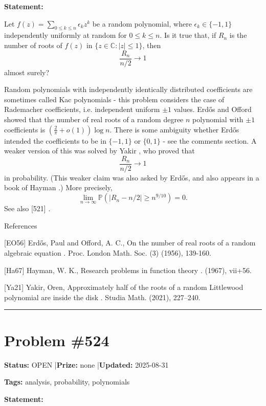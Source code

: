 \documentclass{article}
\begin{document}
\noindent\textbf{Statement:}

Let $f(z)=\sum_{0\leq k\leq n} \epsilon_k z^k$ be a random polynomial, where $\epsilon_k\in \{-1,1\}$ independently uniformly at random for $0\leq k\leq n$. Is it true that, if $R_n$ is the number of roots of $f(z)$ in $\{ z\in \mathbb{C} : \lvert z\rvert \leq 1\}$, then\[\frac{R_n}{n/2}\to 1\]almost surely?




Random polynomials with independently identically distributed coefficients are sometimes called Kac polynomials - this problem considers the case of Rademacher coefficients, i.e. independent uniform $\pm 1$ values. Erd\H{o}s and Offord \cite{EO56} showed that the number of real roots of a random degree $n$ polynomial with $\pm 1$ coefficients is $(\frac{2}{\pi}+o(1))\log n$. There is some ambiguity whether Erd\H{o}s intended the coefficients to be in $\{-1,1\}$ or $\{0,1\}$ - see the comments section. A weaker version of this was solved by Yakir \cite{Ya21}, who proved that\[\frac{R_n}{n/2}\to 1\]in probability. (This weaker claim was also asked by Erd\H{o}s, and also appears in a book of Hayman \cite{Ha67}.) More precisely,\[\lim_{n\to \infty} \mathbb{P}(\lvert R_n-n/2\rvert \geq n^{9/10}) =0.\]See also [521] .




References

[EO56] Erd\H{o}s, Paul and Offord, A. C., On the number of real roots of a random algebraic equation . Proc. London Math. Soc. (3) (1956), 139-160.

[Ha67] Hayman, W. K., Research problems in function theory . (1967), vii+56.

[Ya21] Yakir, Oren, Approximately half of the roots of a random {L}ittlewood polynomial are inside the disk . Studia Math. (2021), 227--240.

\noindent\rule{\linewidth}{0.4pt}


\section{Problem \#524}
\label{prob:524}

\noindent\textbf{Status:} OPEN \quad|\quad \textbf{Prize:} none \quad|\quad \textbf{Updated:} 2025-08-31

\noindent\textbf{Tags:} analysis, probability, polynomials

\medskip

\noindent\textbf{Statement:}
\end{document}

